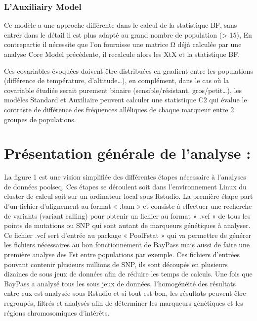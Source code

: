 \documentclass[
  openany]{book}
\theoremstyle{definition}
\theoremstyle{definition}
\theoremstyle{definition}
\theoremstyle{definition}
\theoremstyle{remark}
\begin{document}
\hypertarget{lauxiliairy-model}{%
\subsubsection*{L'Auxiliairy Model}\label{lauxiliairy-model}}

Ce modèle a une approche différente dans le calcul de la statistique BF, sans entrer dans le détail il est plus adapté au grand nombre de population (\textgreater{} 15), En contrepartie il nécessite que l'on fournisse une matrice Ω déjà calculée par une analyse Core Model précédente, il recalcule alors les XtX et la statistique BF.

Ces covariables évoquées doivent être distribuées en gradient entre les populations (différence de température, d'altitude\ldots), en complément, dans le cas où la covariable étudiée serait purement binaire (sensible/résistant, gros/petit\ldots), les modèles Standard et Auxiliaire peuvent calculer une statistique C2 qui évalue le contraste de différence des fréquences alléliques de chaque marqueur entre 2 groupes de populations.

\hypertarget{pruxe9sentation-guxe9nuxe9rale-de-lanalyse}{%
\section*{Présentation générale de l'analyse :}\label{pruxe9sentation-guxe9nuxe9rale-de-lanalyse}}

La figure 1 est une vision simplifiée des différentes étapes nécessaire à l'analyses de données poolseq. Ces étapes se déroulent soit dans l'environnement Linux du cluster de calcul soit sur un ordinateur local sous Rstudio.
La première étape part d'un fichier d'alignement au format « .bam » et consiste à effectuer une recherche de variants (variant calling) pour obtenir un fichier au format « .vcf » de tous les points de mutations ou SNP qui sont autant de marqueurs génétiques à analyser. Ce fichier .vcf sert d'entrée au package « PoolFstat » qui va permettre de générer les fichiers nécessaires au bon fonctionnement de BayPass mais aussi de faire une première analyse des Fst entre populations par exemple. Ces fichiers d'entrées pouvant contenir plusieurs millions de SNP, ils sont découpés en plusieurs dizaines de sous jeux de données afin de réduire les temps de calculs. Une fois que BayPass a analysé tous les sous jeux de données, l'homogénéité des résultats entre eux est analysée sous Rstudio et si tout est bon, les résultats peuvent être regroupés, filtrés et analysés afin de déterminer les marqueurs génétiques et les régions chromosomiques d'intérêts.
\end{document}
